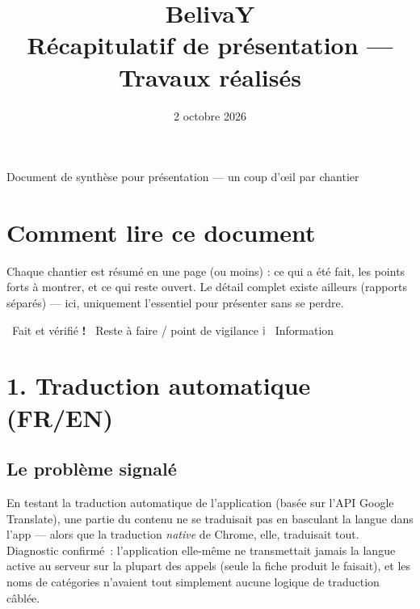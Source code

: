 \documentclass[11pt]{article}
\title{\textcolor{belivayorange}{\Huge BelivaY} \\[6pt] \Large Récapitulatif de présentation — Travaux réalisés}
\author{}
\date{2 octobre 2026}
\begin{document}
\maketitle
\vspace{-1.2cm}
\begin{center}\color{graytext}Document de synthèse pour présentation — un coup d'œil par chantier\end{center}
\vspace{0.6cm}

\section*{Comment lire ce document}
Chaque chantier est résumé en une page (ou moins) : ce qui a été fait, les points forts à montrer, et ce qui reste ouvert. Le détail complet existe ailleurs (rapports séparés) — ici, uniquement l'essentiel pour présenter sans se perdre.

\vspace{0.3cm}
\noindent\textcolor{okgreen}{\textbf{\checkmark}} \, Fait et vérifié \hspace{1.2cm} \textcolor{warnred}{\textbf{!}} \, Reste à faire / point de vigilance \hspace{1.2cm} \textcolor{graytext}{\textbf{i}} \, Information

\newpage

\section*{1. Traduction automatique (FR/EN)}

\subsection*{Le problème signalé}
En testant la traduction automatique de l'application (basée sur l'API Google Translate), une partie du contenu ne se traduisait pas en basculant la langue dans l'app — alors que la traduction \emph{native} de Chrome, elle, traduisait tout. Diagnostic confirmé~: l'application elle-même ne transmettait jamais la langue active au serveur sur la plupart des appels (seule la fiche produit le faisait), et les noms de catégories n'avaient tout simplement aucune logique de traduction câblée.
\end{document}
